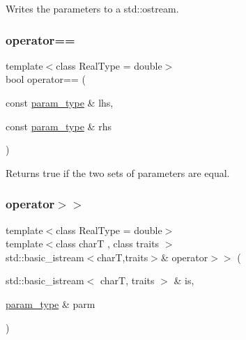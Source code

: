 Writes the parameters to a std\+::ostream. 

\mbox{\label{classpareto__distribution_1_1param__type_ae6f3b58e629ce7a54b5e18a4f05dbc5a}} 
\subsubsection{\texorpdfstring{operator==}{operator==}}
{\footnotesize\ttfamily template$<$class Real\+Type  = double$>$ \\
bool operator== (\begin{DoxyParamCaption}\item[{const \mbox{\hyperlink{classpareto__distribution_1_1param__type}{param\+\_\+type}} \&}]{lhs,  }\item[{const \mbox{\hyperlink{classpareto__distribution_1_1param__type}{param\+\_\+type}} \&}]{rhs }\end{DoxyParamCaption})\hspace{0.3cm}{\ttfamily [friend]}}



Returns true if the two sets of parameters are equal. 

\mbox{\label{classpareto__distribution_1_1param__type_a92d697e987c5ea22b3732a535e3e922d}} 
\subsubsection{\texorpdfstring{operator$>$$>$}{operator>>}}
{\footnotesize\ttfamily template$<$class Real\+Type  = double$>$ \\
template$<$class charT , class traits $>$ \\
std\+::basic\+\_\+istream$<$charT,traits$>$\& operator$>$$>$ (\begin{DoxyParamCaption}\item[{std\+::basic\+\_\+istream$<$ charT, traits $>$ \&}]{is,  }\item[{\mbox{\hyperlink{classpareto__distribution_1_1param__type}{param\+\_\+type}} \&}]{parm }\end{DoxyParamCaption})\hspace{0.3cm}{\ttfamily [friend]}}




